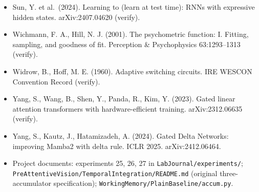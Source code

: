 \documentclass[

]{article}
\begin{document}
\begin{itemize}
\item

  Sun, Y. et al.~(2024). Learning to (learn at test time): RNNs with expressive hidden states. arXiv:2407.04620 (verify).

\item

  Wichmann, F. A., Hill, N. J. (2001). The psychometric function: I. Fitting, sampling, and goodness of fit. Perception \& Psychophysics 63:1293--1313 (verify).

\item

  Widrow, B., Hoff, M. E. (1960). Adaptive switching circuits. IRE WESCON Convention Record (verify).

\item

  Yang, S., Wang, B., Shen, Y., Panda, R., Kim, Y. (2023). Gated linear attention transformers with hardware-efficient training. arXiv:2312.06635 (verify).

\item

  Yang, S., Kautz, J., Hatamizadeh, A. (2024). Gated Delta Networks: improving Mamba2 with delta rule. ICLR 2025. arXiv:2412.06464.

\item

  Project documents: experiments 25, 26, 27 in \texttt{LabJournal/experiments/}; \texttt{PreAttentiveVision/TemporalIntegration/README.md} (original three-accumulator specification); \texttt{WorkingMemory/PlainBaseline/accum.py}.

\end{itemize}
\end{document}
